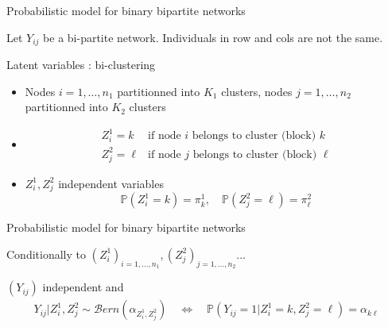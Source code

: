 \documentclass[compress,10pt]{beamer}
\begin{document}
\begin{frame}{Probabilistic model for binary  bipartite networks}

Let $Y_{ij}$ be a bi-partite network. Individuals in row and cols are not the same. 

\begin{block}{Latent variables : bi-clustering}
\begin{itemize}
\item Nodes $i= 1,\dots,n_1$   partitionned into $K_1$ clusters,  nodes $j= 1,\dots,n_2$  partitionned into $K_2$ clusters
\item $$\begin{array}{cl}
Z^1_i = k & \mbox{if node $i$ belongs to cluster (block) $k$}\\
Z^2_j = \ell & \mbox{if node $j$ belongs to cluster (block) $\ell$}
\end{array}$$
\item $Z^1_i, Z^2_j$ independent variables
$$ \mathbb{P}(Z^1_i = k) = \pi^1_k,\quad  \mathbb{P}(Z^2_j = \ell) = \pi^2_\ell$$
\end{itemize}
\end{block}

\end{frame}

\begin{frame}{Probabilistic model for binary  bipartite networks}


\begin{block}{Conditionally to $(Z^1_i)_{i=1,\dots,n_1},(Z^2_j)_{j=1,\dots,n_2}$... }

$(Y_{ij})$ independent and 
\begin{eqnarray*}
 Y_{ij}  | Z^1_i, Z^2_j \sim  \mathcal{B}ern(\alpha_{Z^1_i,Z^2_j}) \quad \Leftrightarrow \quad   \mathbb{P}(Y_{ij} = 1 | Z^1_i = k, Z^2_j = \ell)  =  \alpha_{k\ell}
\end{eqnarray*}
\end{block}
 

\textcolor{mygreen}{\cite{Govaert2008}}

\end{frame}
\end{document}
